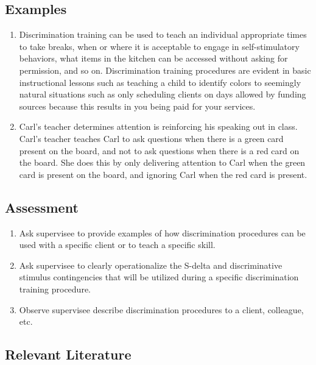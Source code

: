 \subsection{Examples}
\begin{enumerate}
\item Discrimination training can be used to teach an individual appropriate times to take breaks, when or where it is acceptable to engage in self-stimulatory behaviors, what items in the kitchen can be accessed without asking for permission, and so on. Discrimination training procedures are evident in basic instructional lessons such as teaching a child to identify colors to seemingly natural situations such as only scheduling clients on days allowed by funding sources because this results in you being paid for your services. 
\item Carl's teacher determines attention is reinforcing his speaking out in class. Carl's teacher teaches Carl to ask questions when there is a green card present on the board, and not to ask questions when there is a red card on the board. She does this by only delivering attention to Carl when the green card is present on the board, and ignoring Carl when the red card is present. 
\end{enumerate}
%
\subsection{Assessment}
\begin{enumerate}
\item Ask supervisee to provide examples of how discrimination procedures can be used with a specific client or to teach a specific skill.
\item Ask supervisee to clearly operationalize the S-delta and discriminative stimulus contingencies that will be utilized during a specific discrimination training procedure.
\item Observe supervisee describe discrimination procedures to a client, colleague, etc.
\end{enumerate}
%
\subsection{Relevant Literature}
\begin{refsection}
\nocite{test,alang2017police,clayton2018black}
\printbibliography[heading=none]
\end{refsection}
%
